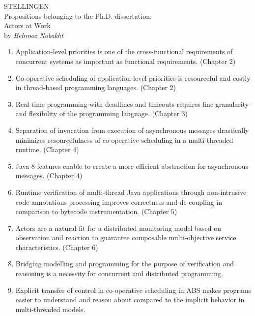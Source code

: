 \documentclass[a5paper,10pt]{article}
\begin{document}
 
\begin{center}
{\Large \uppercase{Stellingen}}\\
Propositions belonging to the Ph.D. dissertation:\\
{\large Actors at Work}\\
by \textsl{Behrooz Nobakht}\\[1.5em]
\end{center}

\begin{enumerate}
\item Application-level priorities is one of the cross-functional requirements
of concurrent systems as important as functional requirements. (Chapter 2)

\item Co-operative scheduling of application-level priorities 
is resourceful and costly in thread-based programming languages. (Chapter 2)

\item Real-time programming with deadlines and timeouts requires 
fine granularity and flexibility of the programming language. (Chapter 3)

\item Separation of invocation from execution of asynchronous messages
drastically minimizes resourcefulness of co-operative scheduling
in a multi-threaded runtime. (Chapter 4)

\item Java 8 features enable to create a more efficient abstraction for 
asynchronous messages. (Chapter 4)

\item Runtime verification of multi-thread Java applications through
non-intrusive code annotations processing improves correctness and de-coupling in
comparison to bytecode instrumentation. (Chapter 5)

\item Actors are a natural fit for a distributed monitoring model
based on observation and reaction to guarantee composable 
multi-objective service characteristics. (Chapter 6)

\item Bridging modelling and programming for the purpose of verification 
and reasoning is a necessity for concurrent and distributed programming.

\item Explicit transfer of control in co-operative scheduling in ABS makes
programs easier to understand and reason about compared to the implicit
behavior in multi-threaded models.


\end{enumerate}
\end{document}
